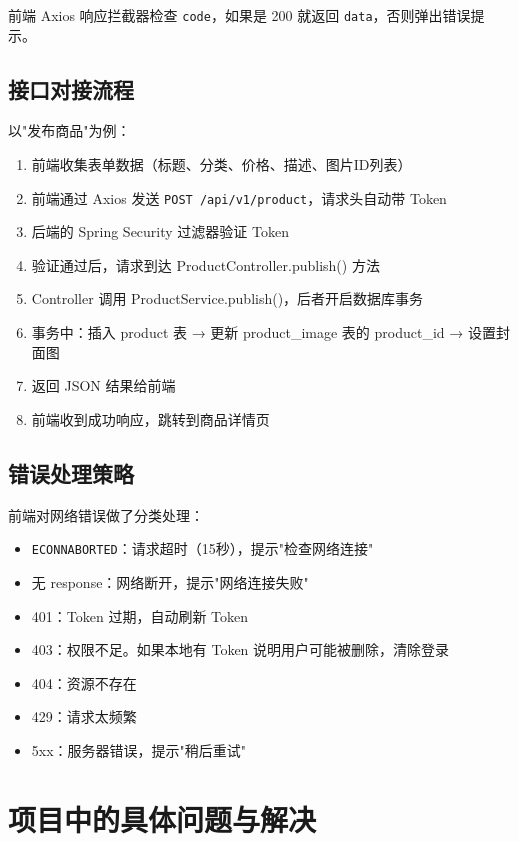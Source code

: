 \documentclass[12pt,a4paper]{ctexart}
\begin{document}
前端 Axios 响应拦截器检查 \texttt{code}，如果是 200 就返回 \texttt{data}，否则弹出错误提示。

\subsection{接口对接流程}

以"发布商品"为例：
\begin{enumerate}
  \item 前端收集表单数据（标题、分类、价格、描述、图片ID列表）
  \item 前端通过 Axios 发送 \texttt{POST /api/v1/product}，请求头自动带 Token
  \item 后端的 Spring Security 过滤器验证 Token
  \item 验证通过后，请求到达 ProductController.publish() 方法
  \item Controller 调用 ProductService.publish()，后者开启数据库事务
  \item 事务中：插入 product 表 → 更新 product\_image 表的 product\_id → 设置封面图
  \item 返回 JSON 结果给前端
  \item 前端收到成功响应，跳转到商品详情页
\end{enumerate}

\subsection{错误处理策略}

前端对网络错误做了分类处理：
\begin{itemize}
  \item \texttt{ECONNABORTED}：请求超时（15秒），提示"检查网络连接"
  \item 无 response：网络断开，提示"网络连接失败"
  \item 401：Token 过期，自动刷新 Token
  \item 403：权限不足。如果本地有 Token 说明用户可能被删除，清除登录
  \item 404：资源不存在
  \item 429：请求太频繁
  \item 5xx：服务器错误，提示"稍后重试"
\end{itemize}

\section{项目中的具体问题与解决}
\end{document}
